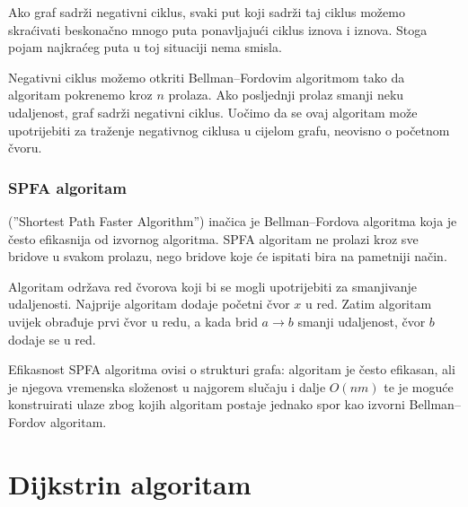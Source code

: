 Ako graf sadrži negativni ciklus,
svaki put koji sadrži taj ciklus možemo
skraćivati beskonačno mnogo puta ponavljajući ciklus
iznova i iznova.
Stoga pojam najkraćeg puta
u toj situaciji nema smisla.

Negativni ciklus možemo otkriti
Bellman–Fordovim algoritmom tako da
algoritam pokrenemo kroz $n$ prolaza.
Ako posljednji prolaz smanji neku udaljenost,
graf sadrži negativni ciklus.
Uočimo da se ovaj algoritam može upotrijebiti za
traženje
negativnog ciklusa u cijelom grafu,
neovisno o početnom čvoru.

\subsubsection{SPFA algoritam}


 (''Shortest Path Faster Algorithm'') \cite{fan94}
inačica je Bellman–Fordova algoritma
koja je često efikasnija od izvornog algoritma.
SPFA algoritam ne prolazi kroz sve bridove u svakom prolazu,
nego bridove koje će ispitati bira
na pametniji način.

Algoritam održava red čvorova koji bi se
mogli upotrijebiti za smanjivanje udaljenosti.
Najprije algoritam dodaje početni čvor $x$
u red.
Zatim algoritam uvijek obrađuje
prvi čvor u redu, a kada brid
$a \rightarrow b$ smanji udaljenost,
čvor $b$ dodaje se u red.
% 
% 

Efikasnost SPFA algoritma ovisi
o strukturi grafa:
algoritam je često efikasan,
ali je njegova vremenska složenost u najgorem slučaju i dalje
$O(nm)$ te je moguće konstruirati ulaze
zbog kojih algoritam postaje jednako spor kao
izvorni Bellman–Fordov algoritam.

\section{Dijkstrin algoritam}

